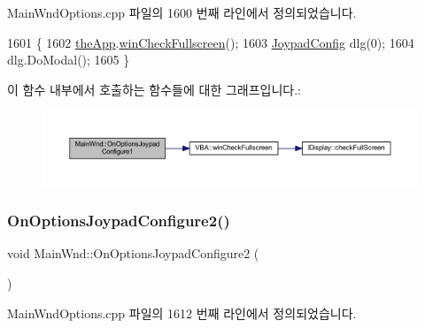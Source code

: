 Main\+Wnd\+Options.\+cpp 파일의 1600 번째 라인에서 정의되었습니다.


\begin{DoxyCode}
1601 \{
1602   \mbox{\hyperlink{_v_b_a_8cpp_a8095a9d06b37a7efe3723f3218ad8fb3}{theApp}}.\mbox{\hyperlink{class_v_b_a_a340eaeeb7fcfc242f08ac3442d991a96}{winCheckFullscreen}}();
1603   \mbox{\hyperlink{class_joypad_config}{JoypadConfig}} dlg(0);
1604   dlg.DoModal();
1605 \}
\end{DoxyCode}
이 함수 내부에서 호출하는 함수들에 대한 그래프입니다.\+:
\nopagebreak
\begin{figure}[H]
\begin{center}
\leavevmode
\includegraphics[width=350pt]{class_main_wnd_af3ee3cb477d6492d5a548cf41ad1b16f_cgraph}
\end{center}
\end{figure}
\mbox{\label{class_main_wnd_afb2b65a9fbb1b37c10b73c1752b94f4e}} 
\subsubsection{\texorpdfstring{On\+Options\+Joypad\+Configure2()}{OnOptionsJoypadConfigure2()}}
{\footnotesize\ttfamily void Main\+Wnd\+::\+On\+Options\+Joypad\+Configure2 (\begin{DoxyParamCaption}{ }\end{DoxyParamCaption})\hspace{0.3cm}{\ttfamily [protected]}}



Main\+Wnd\+Options.\+cpp 파일의 1612 번째 라인에서 정의되었습니다.


